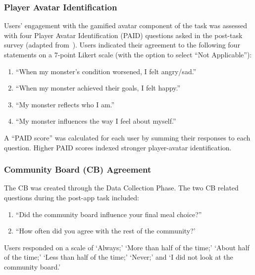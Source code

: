 \subsubsection{Player Avatar Identification}
Users' engagement with the gamified avatar component of the task was assessed with four Player Avatar Identification (PAID) questions asked in the post-task survey (adapted from~\cite{li2013player}). Users indicated their agreement to the following four statements on a 7-point Likert scale (with the option to select ``Not Applicable''): 
\begin{enumerate}
    \item ``When my monster’s condition worsened, I felt angry/sad.''
    \item ``When my monster achieved their goals, I felt happy.''
    \item ``My monster reflects who I am.''
    \item ``My monster influences the way I feel about myself.'' 
\end{enumerate}
A ``PAID score'' was calculated for each user by summing their responses to each question. Higher PAID scores indexed stronger player-avatar identification.

\subsubsection{Community Board (CB) Agreement}

The CB was created through the Data Collection Phase. The two CB related questions during the post-app task included: 
\begin{enumerate}
    \item ``Did the community board influence your final meal choice?'' 
    \item ``How often did you agree with the rest of the community?'
\end{enumerate}

Users responded on a scale of `Always;' `More than half of the time;' `About half of the time;' `Less than half of the time;' `Never;' and `I did not look at the community board.' 

